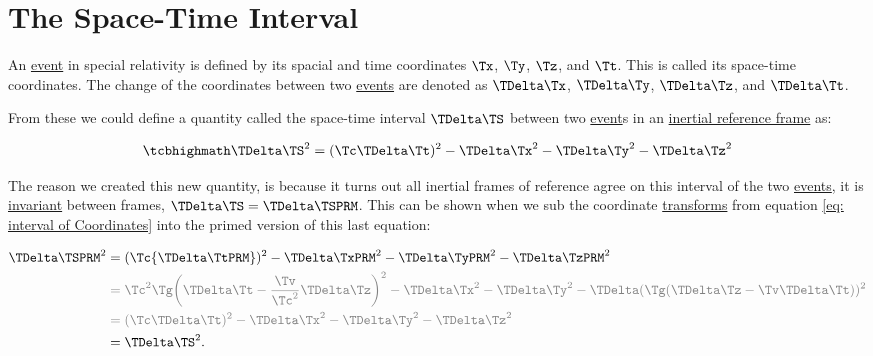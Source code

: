 \section{The Space-Time Interval} \label{sect: Space-Time Interval}

An \hyperlink{def-event}{event} in special relativity is defined by its spacial and time coordinates $\Tx $, $\Ty $, $\Tz $, and $\Tt $. This is called its space-time coordinates.
The change of the coordinates between two \hyperlink{def-event}{events} are denoted as ${\TDelta  \Tx }$, ${\TDelta  \Ty }$, ${\TDelta  \Tz }$, and ${\TDelta  \Tt }$.

From these we could define a quantity called the space-time interval $\TDelta  \TS $ between two \hyperlink{def-event}{event}s in an \hyperlink{def-Inertial-reference-frame}{inertial reference frame} as:

\begin{equation}
	\label{eq: space-time interval}
	\mhl{
	\TDelta  \TS ^2 = (\Tc \TDelta  \Tt )^2-{\TDelta  \Tx }^2-{\TDelta  \Ty }^2-{\TDelta  \Tz }^2
	}
\end{equation}

The reason we created this new quantity, is because it turns out all inertial frames of reference agree on this interval of the two \hyperlink{def-event}{events}, it is \hyperlink{def-lorentz-invariant}{invariant} between frames, $\TDelta  \TS  = \TDelta  \TSPRM $.
This can be shown when we sub the coordinate \hyperlink{def-transform}{transforms} from equation \eqref{eq: interval of Coordinates} into the primed version of this last equation:

\begin{equation}
	\begin{aligned}
		\TDelta  \TSPRM ^2 & = (\Tc {\TDelta  \TtPRM  })^2-\TDelta  \TxPRM ^2-{\TDelta  \TyPRM  }^2-{\TDelta  \TzPRM  }^2                                                                                          \\
		              & \color{gray} = \Tc ^2{\Tg } \bigg( \TDelta  \Tt -\frac{\Tv }{ \Tc ^2} {\TDelta  \Tz } \bigg)^2-{\TDelta  \Tx }^2-{\TDelta  \Ty }^2-\TDelta  ({\Tg } ( {\TDelta  \Tz }- \Tv  \TDelta  \Tt ) )^2 \\
		              & \color{gray} = (\Tc \TDelta  \Tt )^2-{\TDelta  \Tx }^2-{\TDelta  \Ty }^2-{\TDelta  \Tz }^2                                                                                         \\
		              & = \TDelta  \TS ^2.
	\end{aligned}
\end{equation}

